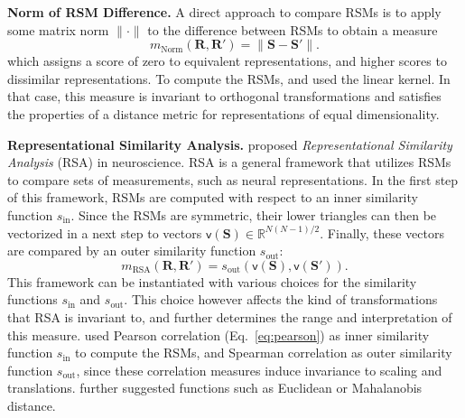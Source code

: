\documentclass{article}
\newcommand{\citet}{\textcite}
\newcommand{\Real}{\mathbb{R}}
\newcommand{\R}{\bm{R}}
\newcommand{\Rp}{\bm{R'}}
\newcommand{\Sm}{\bm{S}}
\newcommand{\Smp}{\bm{S'}}
\newcommand\myeqref[1]{%
    (\textup{Eq.~\ref{#1}})%
}
\newcommand{\subheader}{\textbf}
\begin{document}
\subheader{Norm of RSM Difference.}
A direct approach to compare RSMs is to apply some matrix norm $\|\cdot\|$ to the difference between RSMs to obtain a measure
\begin{equation}\label{eq:rsm_norm}
    m_{\operatorname{Norm}}(\R, \Rp) = \|\Sm - \Smp\|.
\end{equation}
which assigns a score of zero to equivalent representations, and higher scores to dissimilar representations.
To compute the RSMs, \citet{shahbazi_using_2021} and \citet{yin_dimensionality_2018} used the linear kernel.
In that case, this measure is invariant to orthogonal transformations and satisfies the properties of a distance metric for representations of equal dimensionality.


\subheader{Representational Similarity Analysis.}
\citet{kriegeskorte_representational_2008} proposed \emph{Representational Similarity Analysis} (RSA) in neuroscience.
RSA is a general framework that utilizes RSMs to compare sets of measurements, such as neural representations.
In the first step of this framework, RSMs are computed with respect to an inner similarity function $s_\text{in}$.
Since the RSMs are symmetric, their lower triangles can then be vectorized in a next step to vectors $\mathsf{v}(\Sm)\in\Real^{N(N-1)/2}$.
Finally, these vectors are compared by an outer similarity function $s_\text{out}$:
\begin{equation}\label{eq:rsa}
    m_{\operatorname{RSA}}(\R, \Rp) = s_\text{out}(\mathsf{v}(\Sm), \mathsf{v}(\Smp)).
\end{equation}
%
This framework can be instantiated with various choices for the similarity functions $s_\text{in}$ and $s_\text{out}$.
This choice however affects the kind of transformations that RSA is invariant to, and further determines the range and interpretation of this measure.
\citet{kriegeskorte_representational_2008} used Pearson correlation \myeqref{eq:pearson} as inner similarity function $s_\text{in}$ to compute the RSMs, and Spearman correlation as outer similarity function $s_\text{out}$, since these correlation measures induce invariance to scaling and translations.
\citet{kriegeskorte_representational_2008} further suggested functions such as Euclidean or Mahalanobis distance.
\end{document}
